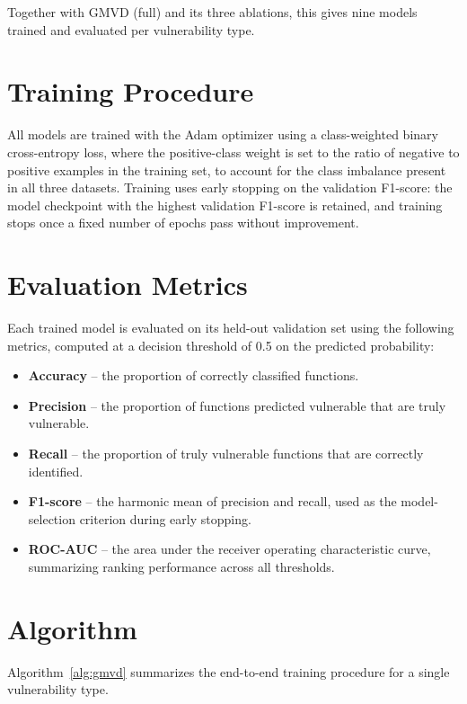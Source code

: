\documentclass[12pt, a4paper, openright, twoside]{report}
\begin{document}
Together with GMVD (full) and its three ablations, this gives nine models trained and evaluated per vulnerability type.

\section{Training Procedure}

All models are trained with the Adam optimizer using a class-weighted binary cross-entropy loss, where the positive-class weight is set to the ratio of negative to positive examples in the training set, to account for the class imbalance present in all three datasets. Training uses early stopping on the validation F1-score: the model checkpoint with the highest validation F1-score is retained, and training stops once a fixed number of epochs pass without improvement.

\section{Evaluation Metrics}

Each trained model is evaluated on its held-out validation set using the following metrics, computed at a decision threshold of 0.5 on the predicted probability:

\begin{itemize}
    \item \textbf{Accuracy} -- the proportion of correctly classified functions.
    \item \textbf{Precision} -- the proportion of functions predicted vulnerable that are truly vulnerable.
    \item \textbf{Recall} -- the proportion of truly vulnerable functions that are correctly identified.
    \item \textbf{F1-score} -- the harmonic mean of precision and recall, used as the model-selection criterion during early stopping.
    \item \textbf{ROC-AUC} -- the area under the receiver operating characteristic curve, summarizing ranking performance across all thresholds.
\end{itemize}

\section{Algorithm}

Algorithm~\ref{alg:gmvd} summarizes the end-to-end training procedure for a single vulnerability type.
\end{document}
